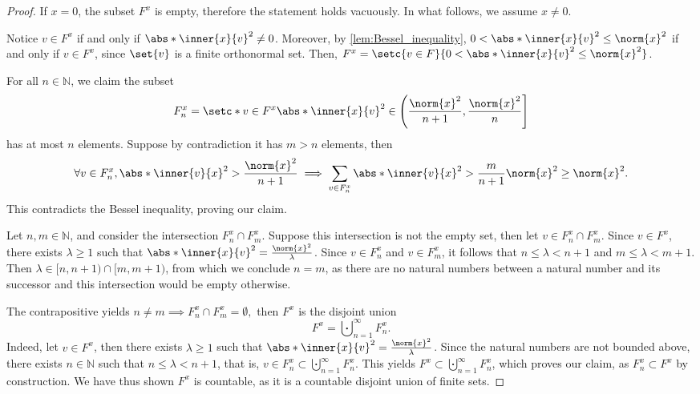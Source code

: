 \begin{proof}
    If \(x = 0\), the subset \(F^x\) is empty, therefore the statement holds vacuously. In what follows, we assume \(x \neq 0\).

    Notice \(v \in F^x\) if and only if \(\abs*{\inner{x}{v}}^2 \neq 0\). Moreover, by \cref{lem:Bessel_inequality}, \(0 < \abs*{\inner{x}{v}}^2 \leq \norm{x}^2\) if and only if \(v \in F^x\), since \(\set{v}\) is a finite orthonormal set. Then, \(F^x = \setc{v \in F}{0 < \abs*{\inner{x}{v}}^2 \leq \norm{x}^2}\).

    For all \(n \in \mathbb{N}\), we claim the subset
    \begin{equation*}
        F^x_n = \setc*{v \in F^x}{\abs*{\inner{x}{v}}^2 \in \left(\frac{\norm{x}^2}{n+1}, \frac{\norm{x}^2}{n}\right]}
    \end{equation*}
    has at most \(n\) elements. Suppose by contradiction it has \(m > n\) elements, then
    \begin{equation*}
        \forall v \in F^x_n, \abs*{\inner{v}{x}}^2 > \frac{\norm{x}^2}{n+1} \implies \sum_{v \in F^x_n} \abs*{\inner{v}{x}}^2 > \frac{m}{n+1} \norm{x}^2 \geq \norm{x}^2.
    \end{equation*}
    This contradicts the Bessel inequality, proving our claim.

    Let \(n,m \in \mathbb{N}\), and consider the intersection \(F^x_n \cap F^x_m\). Suppose this intersection is not the empty set, then let \(v \in F^x_n \cap F^x_m\). Since \(v \in F^x\), there exists \(\lambda \geq 1\) such that \(\abs*{\inner{x}{v}}^2 = \frac{\norm{x}^2}{\lambda}\). Since \(v \in F^x_n\) and \(v \in F^x_m\), it follows that \(n \leq \lambda < n+1\) and \(m \leq \lambda < m+1\). Then \(\lambda \in [n, n+1) \cap [m,m+1)\), from which we conclude \(n = m\), as there are no natural numbers between a natural number and its successor and this intersection would be empty otherwise.

    The contrapositive yields \(n \neq m \implies F^x_n \cap F^x_m = \emptyset,\) then \(F^x\) is the disjoint union
    \begin{equation*}
        F^x = \bigcupdot_{n=1}^\infty F^x_n.
    \end{equation*}
    Indeed, let \(v \in F^x\), then there exists \(\lambda \geq 1\) such that \(\abs*{\inner{x}{v}}^2 = \frac{\norm{x}^2}{\lambda}\). Since the natural numbers are not bounded above, there exists \(n \in \mathbb{N}\) such that \(n \leq \lambda < n+1\), that is, \(v \in F^x_n \subset \bigcupdot_{n=1}^\infty F^x_n\). This yields \(F^x \subset \bigcupdot_{n=1}^\infty F^x_n\), which proves our claim, as \(F^x_n \subset F^x\) by construction. We have thus shown \(F^x\) is countable, as it is a countable disjoint union of finite sets.
\end{proof}

